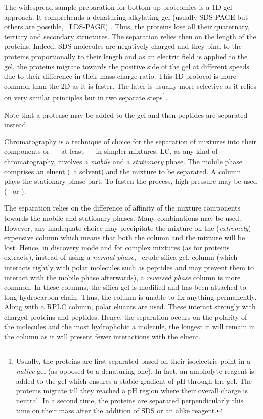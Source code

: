 The widespread sample preparation for bottom-up proteomics is a 1D-gel approach.
It comprehends a denaturing alkylating gel (usually \gls{SDS-PAGE} but others are
possible, \eg\ \gls{LDS-PAGE}) . Thus, the proteins lose
all their quaternary, tertiary and secondary structures. The separation relies
then on the length of the proteins. Indeed, \gls{SDS} molecules are negatively
charged and they bind to the proteins proportionally to their length and as an
electric field is applied to the gel, the proteins migrate towards the positive
side of the gel at different speeds due to their difference in their mass-charge
ratio. This 1D protocol is more common than the 2D as it is faster. The later is
usually more selective as it relies on very similar principles but in two separate
steps\footnote{Usually, the proteins are first separated based on their
isoelectric point in a \emph{native} gel (as opposed to a denaturing one).
In fact, an \gls{ampholyte} reagent is added to the gel which ensures a stable
gradient of \gls{pH} through the gel. The proteins migrate till they reached a
\gls{pH} region where their overall charge is neutral. In a second time, the
proteins are separated perpendicularly this time on their mass after the addition
of \gls{SDS} or an alike reagent.}.

Note that a protease may be added to the gel and then peptides are separated
instead.


Chromatography is a technique of choice for the separation of mixtures into their
components or --- at least --- in simpler mixtures. \gls{LC}, as any kind of
chromatography, involves a \emph{mobile} and a \emph{stationary} phase.
The mobile phase comprises an eluent (\ie\ a solvent) and the mixture to be
separated. A column plays the stationary phase part. To fasten the process, high
pressure may be used (\eg\  or ).

The separation relies on the difference of affinity of the mixture components
towards the mobile and stationary phases. Many combinations may be used. However,
any inadequate choice may precipitate the mixture on the (\emph{extremely})
expensive column which means that both the column and the mixture will be lost.
Hence, in discovery mode and for complex mixtures (as for proteins extracts),
instead of using a \emph{normal phase}, \ie\ crude silica-gel, column (which
interacts tightly with polar molecules such as peptides and may prevent them to
interact with the mobile phase afterwards), a \emph{reversed phase} column
is more common. In these columns, the silica-gel is modified and has been
attached to long hydrocarbon chain. Thus, the column is unable to fix anything
permanently. Along with a \gls{RPLC} column, polar eluants are used. These
interact strongly with charged proteins and peptides. Hence, the separation
occurs on the polarity of the molecules and the most hydrophobic a molecule,
the longest it will remain in the column as it will present fewer interactions
with the eluent.

